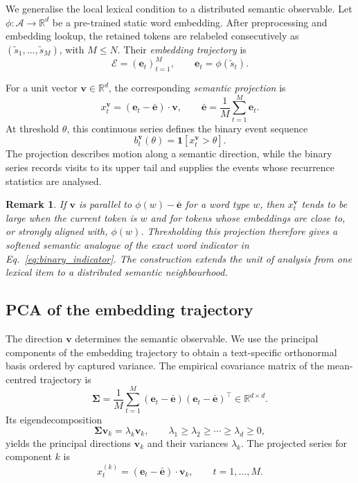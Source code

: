 \documentclass[12pt,a4paper]{article}
\newtheorem{remark}{Remark}
\newcommand{\lk}{\lambda_k}
\newcommand{\xtk}{x_t^{(k)}}
\newcommand{\vk}{\mathbf{v}_k}
\newcommand{\et}{\mathbf{e}_t}
\newcommand{\ebar}{\bar{\mathbf{e}}}
\newcommand{\Sig}{\boldsymbol{\Sigma}}
\newcommand{\R}{\mathbb{R}}
\begin{document}
We generalise the local lexical condition to a distributed semantic
observable.
Let $\phi:\mathcal{A}\to\R^d$ be a pre-trained static word embedding.
After preprocessing and embedding lookup, the retained tokens are
relabeled consecutively as $(\tilde s_1,\ldots,\tilde s_M)$, with
$M\leq N$.
Their \emph{embedding trajectory} is
\begin{equation}
  \mathcal{E}=(\et)_{t=1}^M,
  \qquad
  \et=\phi(\tilde s_t).
  \label{eq:trajectory}
\end{equation}

For a unit vector $\mathbf{v}\in\R^d$, the corresponding
\emph{semantic projection} is
\begin{equation}
  x_t^{\mathbf{v}}=(\et-\ebar)\cdot\mathbf{v},
  \qquad
  \ebar=\frac{1}{M}\sum_{t=1}^M\et.
  \label{eq:projection}
\end{equation}
At threshold $\theta$, this continuous series defines the binary event
sequence
\begin{equation}
  b_t^{\mathbf{v}}(\theta)
  =\mathbf{1}\!\left[x_t^{\mathbf{v}}>\theta\right].
  \label{eq:binary_from_proj}
\end{equation}
The projection describes motion along a semantic direction, while the
binary series records visits to its upper tail and supplies the events
whose recurrence statistics are analysed.

\begin{remark}
  If $\mathbf{v}$ is parallel to $\phi(w)-\ebar$ for a word type $w$,
  then $x_t^{\mathbf{v}}$ tends to be large when the current token is
  $w$ and for tokens whose embeddings are close to, or strongly aligned
  with, $\phi(w)$.
  Thresholding this projection therefore gives a softened semantic
  analogue of the exact word indicator in
  Eq.~\eqref{eq:binary_indicator}.
  The construction extends the unit of analysis from one lexical item to
  a distributed semantic neighbourhood.
\end{remark}

\subsection{PCA of the embedding trajectory}
\label{sec:pca}

The direction $\mathbf{v}$ determines the semantic observable.
We use the principal components of the embedding trajectory to obtain a
text-specific orthonormal basis ordered by captured variance.
The empirical covariance matrix of the mean-centred trajectory is
\begin{equation}
  \Sig=
  \frac{1}{M}\sum_{t=1}^M
  (\et-\ebar)(\et-\ebar)^\top
  \in\R^{d\times d}.
  \label{eq:covariance}
\end{equation}
Its eigendecomposition
\begin{equation}
  \Sig\vk=\lk\vk,
  \qquad
  \lambda_1\geq\lambda_2\geq\cdots\geq\lambda_d\geq0,
  \label{eq:pca_eigenproblem}
\end{equation}
yields the principal directions $\vk$ and their variances $\lk$.
The projected series for component $k$ is
\begin{equation}
  \xtk=(\et-\ebar)\cdot\vk,
  \qquad t=1,\ldots,M.
  \label{eq:proj_series}
\end{equation}
\end{document}
